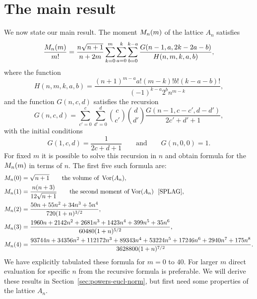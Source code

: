 \documentclass[journal, onecolumn, 11pt]{IEEEtran}
\begin{document}
\section{The main result}\label{sec:main-result}

We now state our main result.  The moment $M_n(m)$ of the lattice $A_n$ satisfies
\begin{equation}\label{eq:theCmformula}
\frac{\calM_n(m)}{m!} = \frac{n\sqrt{n+1}}{n+2m}\sum_{k=0}^{m}\sum_{a =0}^{k}\sum_{b=0}^{k-a} \frac{G(n-1,a,2k - 2a - b)}{H(n,m,k,a,b)},
\end{equation}
where the function
\[
H(n,m,k,a,b) = \frac{(n+1)^{m-a}a!(m-k)!b! (k-a-b)!}{(-1)^{k-a}2^{b} n^{m-k}},
\]
and the function $G(n,c,d)$ satisfies the recursion
\begin{equation}\label{eq:theGrecursion}
G(n,c,d) = \sum_{c'=0}^{c} \sum_{d'=0}^{d} \binom{c}{c'}\binom{d}{d'} \frac{G(n-1,c-c',d-d')}{2c'+d'+1},
\end{equation}
with the initial conditions
\[
G(1,c,d) = \frac{1}{2c+d+1} \qquad \text{and} \qquad G(n,0,0) = 1.
\]
For fixed $m$ it is possible to solve this recursion in $n$ and obtain formula for the $M_n(m)$ in terms of $n$.  The first five such formula are:
\begin{align*}
\calM_n(0) &= \sqrt{n+1} \qquad \text{the volume of } \vor(A_n),\\
\calM_n(1) &= \frac{n(n+3)}{12\sqrt{n+1}} \qquad \text{the second moment of $\vor(A_n)$~ \cite[p. 462]{SPLAG}}, \\
\calM_n(2) &=  \frac{50 n + 55 n^2 + 34 n^3 + 5 n^4}{720 (1 + n)^{3/2}}, \\
\calM_n(3) &= \frac{1960 n + 2142 n^2 + 2681 n^3 + 1423 n^4 + 399 n^5 + 35 n^6}{60480 (1 + n)^{5/2}}, \\
\calM_n(4) &= \frac{93744 n + 34356 n^2 + 112172 n^3 + 89343 n^4 + 53224 n^5 + 17246 n^6 + 2940 n^7 + 175 n^8}{3628800 (1 + n)^{7/2}}.
\end{align*}
We have explicitly tabulated these formula for $m=0$ to $40$. For larger $m$ direct evaluation for specific $n$ from the recursive formula is preferable.  We will derive these results in Section~\ref{sec:powers-eucl-norm}, but first need some properties of the lattice $A_n$.
\end{document}
